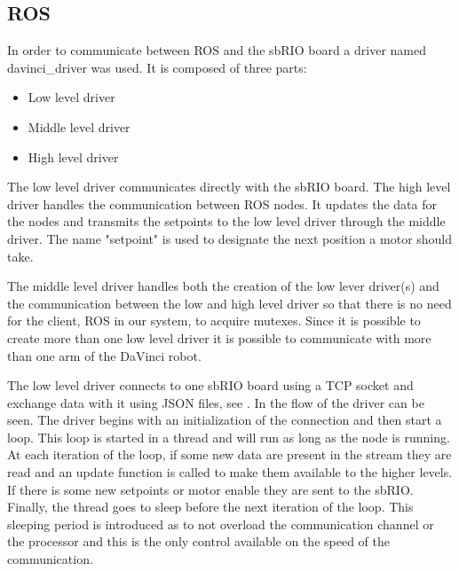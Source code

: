 \subsection{ROS}\label{sec:ros}

In order to communicate between ROS and the sbRIO board a driver named davinci\_driver\cite{davinci_driver} was used. It is composed of three parts:

\begin{itemize}
\item Low level driver
\item Middle level driver
\item High level driver
\end{itemize}


The low level driver communicates directly with the sbRIO board. The high level driver handles the communication between ROS nodes. It updates the data for the nodes and transmits the setpoints to the low level driver through the middle driver. The name "setpoint" is used to designate the next position a motor should take.

The middle level driver handles both the creation of the low lever driver(s) and the communication between the low and high level driver so that there is no need for the client, ROS in our system, to acquire mutexes. Since it is possible to create more than one low level driver it is possible to communicate with more than one arm of the DaVinci robot.

The low level driver connects to one sbRIO board using a TCP socket and exchange data with it using \gls{JSON} files, see . 
In  the flow of the driver can be seen. The driver begins with an initialization of the connection and then start a loop. This loop is started in a thread and will run as long as the node is running. At each iteration of the loop, if some new data are present in the stream they are read and an update function is called to make them available to the higher levels. If there is some new setpoints or motor enable they are sent to the sbRIO. Finally, the thread goes to sleep before the next iteration of the loop. This sleeping period is introduced as to not overload the communication channel or the processor and this is the only control available on the speed of the communication.

